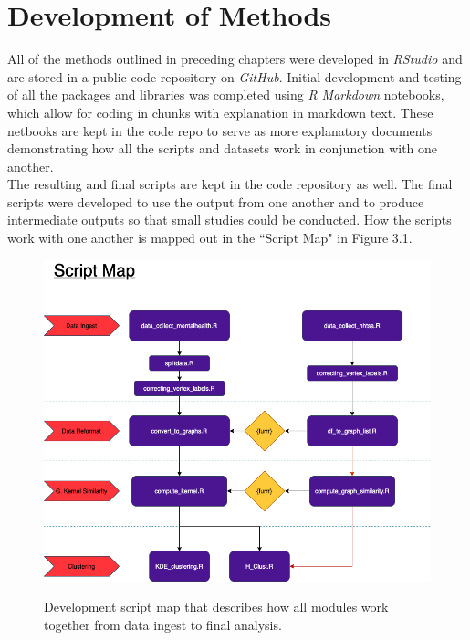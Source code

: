 \section{Development of Methods}

\hspace*{0.3cm} All of the methods outlined in preceding chapters were developed in \textit{RStudio} and are stored in a public code repository on \textit{GitHub}. Initial development and testing of all the packages and libraries was completed using \textit{R Markdown} notebooks, which allow for coding in chunks with explanation in markdown text. These netbooks are kept in the code repo to serve as more explanatory documents demonstrating how all the scripts and datasets work in conjunction with one another. \\

The resulting and final scripts are kept in the code repository as well. The final scripts were developed to use the output from one another and to produce intermediate outputs so that small studies could be conducted. How the scripts work with one another is mapped out in the ``Script Map" in Figure 3.1.\\

\begin{figure}
\includegraphics[width=6in]{Content/Images/ScriptMap.png}\\
\caption{Development script map that describes how all modules work together from data ingest to final analysis.}
\end{figure} 

